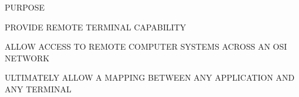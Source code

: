 %




\begin{bwslide}

\begin{nrtc}
\item	PURPOSE
	\begin{nrtc}
	\item	PROVIDE REMOTE TERMINAL CAPABILITY
	\item	ALLOW ACCESS TO REMOTE COMPUTER SYSTEMS ACROSS AN OSI NETWORK
	\item	ULTIMATELY ALLOW A MAPPING BETWEEN ANY APPLICATION AND ANY TERMINAL
	\end{nrtc}
\end{nrtc}
\end{bwslide}


%


